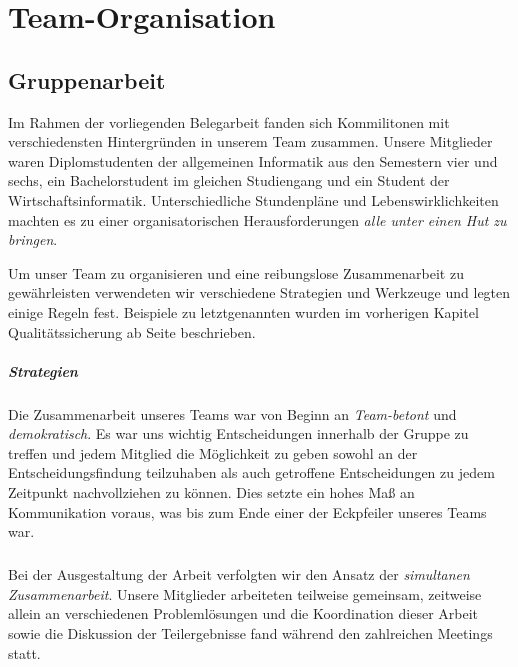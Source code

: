 
\chapter{Team-Organisation}
\section{Gruppenarbeit}
Im Rahmen der vorliegenden Belegarbeit fanden sich Kommilitonen mit verschiedensten Hintergründen in unserem Team zusammen. Unsere Mitglieder waren Diplomstudenten der allgemeinen Informatik aus den Semestern vier und sechs, ein Bachelorstudent im gleichen Studiengang und ein Student der Wirtschaftsinformatik. Unterschiedliche Stundenpläne und Lebenswirklichkeiten machten es zu einer organisatorischen Herausforderungen \glqq \textit{alle unter einen Hut zu bringen}\grqq.

Um unser Team zu organisieren und eine reibungslose Zusammenarbeit zu gewährleisten verwendeten wir verschiedene Strategien und Werkzeuge und legten einige Regeln fest. Beispiele zu letztgenannten wurden im vorherigen Kapitel Qualitätssicherung ab Seite \pageref{QS} beschrieben.

\paragraph{Strategien} Die Zusammenarbeit unseres Teams war von Beginn an \textit{Team-}\textit{betont} und \textit{demokratisch}. Es war uns wichtig Entscheidungen innerhalb der Gruppe zu treffen und jedem Mitglied die Möglichkeit zu geben sowohl an der Entscheidungsfindung teilzuhaben als auch getroffene Entscheidungen zu jedem Zeitpunkt nachvollziehen zu können. Dies setzte ein hohes Maß an Kommunikation voraus, was bis zum Ende einer der Eckpfeiler unseres Teams war.

\paragraph{}Bei der Ausgestaltung der Arbeit verfolgten wir den Ansatz der \textit{simultanen Zusammenarbeit}. Unsere Mitglieder arbeiteten teilweise gemeinsam, zeitweise allein an verschiedenen Problemlösungen und die Koordination dieser Arbeit sowie die Diskussion der Teilergebnisse fand während den zahlreichen Meetings statt.

